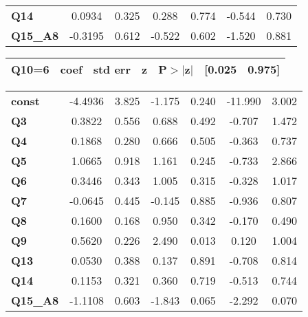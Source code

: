 \begin{center}
\begin{tabular}{lcccccc}
\textbf{Q14}     &       0.0934  &        0.325     &     0.288  &         0.774        &       -0.544    &        0.730     \\
\textbf{Q15\_A8} &      -0.3195  &        0.612     &    -0.522  &         0.602        &       -1.520    &        0.881     \\
\bottomrule
\end{tabular}
\newpage
\begin{tabular}{ccccccc}
 \textbf{Q10=6}  & \textbf{coef} & \textbf{std err} & \textbf{z} & \textbf{P$> |$z$|$} & \textbf{[0.025} & \textbf{0.975]}  \\
\midrule
\bottomrule
\end{tabular}
\begin{tabular}{lcccccc}
\textbf{const}   &      -4.4936  &        3.825     &    -1.175  &         0.240        &      -11.990    &        3.002     \\
\textbf{Q3}      &       0.3822  &        0.556     &     0.688  &         0.492        &       -0.707    &        1.472     \\
\textbf{Q4}      &       0.1868  &        0.280     &     0.666  &         0.505        &       -0.363    &        0.737     \\
\textbf{Q5}      &       1.0665  &        0.918     &     1.161  &         0.245        &       -0.733    &        2.866     \\
\textbf{Q6}      &       0.3446  &        0.343     &     1.005  &         0.315        &       -0.328    &        1.017     \\
\textbf{Q7}      &      -0.0645  &        0.445     &    -0.145  &         0.885        &       -0.936    &        0.807     \\
\textbf{Q8}      &       0.1600  &        0.168     &     0.950  &         0.342        &       -0.170    &        0.490     \\
\textbf{Q9}      &       0.5620  &        0.226     &     2.490  &         0.013        &        0.120    &        1.004     \\
\textbf{Q13}     &       0.0530  &        0.388     &     0.137  &         0.891        &       -0.708    &        0.814     \\
\textbf{Q14}     &       0.1153  &        0.321     &     0.360  &         0.719        &       -0.513    &        0.744     \\
\textbf{Q15\_A8} &      -1.1108  &        0.603     &    -1.843  &         0.065        &       -2.292    &        0.070     \\

\end{tabular}
\end{center}
